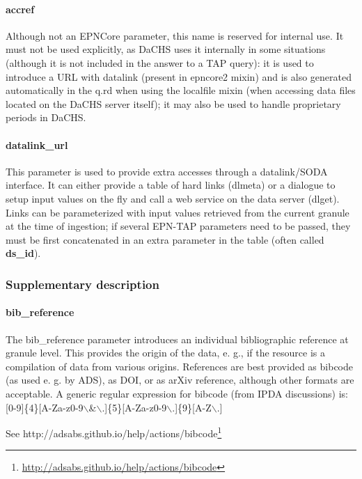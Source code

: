 \documentclass[11pt,a4paper]{ivoa}
\begin{document}
\paragraph{accref}

Although not an EPNCore parameter, this name is reserved for internal use. It must not be used explicitly, as DaCHS uses it internally in some situations (although it is not included in the answer to a TAP query): it is used to introduce a URL with datalink (present in epncore2 mixin) and is also generated automatically in the q.rd when using the localfile mixin (when accessing data files located on the DaCHS server itself); it may also be used to handle proprietary periods in DaCHS. \\

\paragraph{datalink\_url}

This parameter is used to provide extra accesses through a datalink/SODA interface. It can either provide a table of hard links (dlmeta) or a dialogue to setup input values on the fly and call a web service on the data server (dlget). Links can be parameterized with input values retrieved from the current granule at the time of ingestion; if several EPN-TAP parameters need to be passed, they must be first concatenated in an extra parameter in the table (often called \textbf{ds\_id}).

\subsubsection{Supplementary description}

\paragraph{bib\_reference}

The bib\_reference parameter introduces an individual bibliographic reference at granule level. This provides the origin of the data, e. g., if the resource is a compilation of data from various origins. References are best provided as bibcode (as used e. g. by ADS), as DOI, or as arXiv reference, although other formats are acceptable. A generic regular expression for bibcode (from IPDA discussions) is: [0-9]\{4\}[A-Za-z0-9$\backslash$\&$\backslash$.]\{5\}[A-Za-z0-9$\backslash$.]\{9\}[A-Z$\backslash$.] 

See http://adsabs.github.io/help/actions/bibcode\footnote{\url{http://adsabs.github.io/help/actions/bibcode}}
\end{document}

